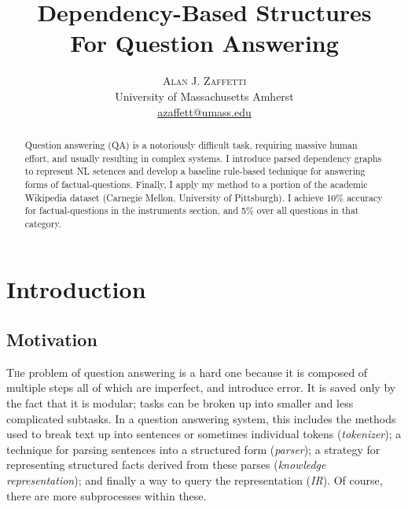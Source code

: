 \documentclass[twoside]{article}
\title{\vspace{-5mm}\fontsize{18pt}{12pt}\selectfont\textbf{Dependency-Based Structures\\For Question Answering}} %
\author{
\large
\textsc{Alan J. Zaffetti}\\[2mm]%
\normalsize University of Massachusetts Amherst \\ %
\normalsize \href{mailto:azaffett@umass.edu}{azaffett@umass.edu} %
}
\date{}
\begin{document}
\maketitle %

\thispagestyle{fancy} %


\begin{abstract}

\noindent Question answering (QA) is a notoriously difficult task, requiring massive human effort, and usually resulting in complex systems.  I introduce parsed dependency graphs to represent NL setences and develop a baseline rule-based technique for answering forms of factual-questions.  Finally, I apply my method to a portion of the academic Wikipedia dataset (Carnegie Mellon, University of Pittsburgh).  I achieve 10\% accuracy for factual-questions in the instruments section, and 5\% over all questions in that category. 

\end{abstract}


\section{Introduction}

\subsection{Motivation}

\lettrine[nindent=0em,lines=3]{T}he problem of question answering is a hard one because it is composed of multiple steps all of which are imperfect, and introduce error.  It is saved only by the fact that it is modular; tasks can be broken up into smaller and less complicated subtasks.  In a question answering system, this includes the methods used to break text up into sentences or sometimes individual tokens (\textit{tokenizer}); a technique for parsing sentences into a structured form (\textit{parser}); a strategy for representing structured facts derived from these parses (\textit{knowledge representation}); and finally a way to query the representation (\textit{IR}). Of course, there are more subprocesses within these.
\end{document}
